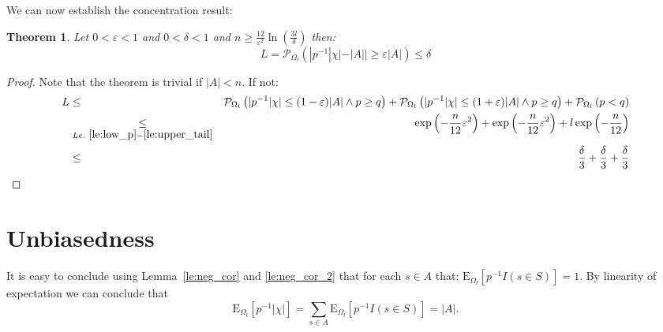 \documentclass{article}
\newcommand{\prob}{\mathcal P}
\newcommand{\expectation}{\mathrm{E}}
\newcommand{\eps}{\varepsilon}
\newtheorem{theorem}{Theorem}
\theoremstyle{definition}
\begin{document}
We can now establish the concentration result:
\begin{theorem}
Let $0 < \eps < 1$ and $0 < \delta < 1$ and $n \geq \frac{12}{\eps^2} \ln\left(\frac{3l}{\delta}\right)$ then:
\[
  L = \prob_{\Omega_l} \left( | p^{-1} |\chi| - |A| | \geq \eps |A| \right) \leq \delta
\]
\end{theorem}
\begin{proof}
Note that the theorem is trivial if $|A| < n$. If not:
\begin{eqnarray*}
  L & \leq & \prob_{\Omega_l} \left( | p^{-1} |\chi| \leq (1-\eps) |A| \wedge p \geq q \right) +
    \prob_{\Omega_l} \left( | p^{-1} |\chi| \leq (1+\eps) |A| \wedge p \geq q \right) +
    \prob_{\Omega_l} \left( p < q \right) \\
    & \underset{Le.~\ref{le:low_p}-\ref{le:upper_tail}}{\leq} &
    \exp\left( - \frac{n}{12} \eps^2 \right)  + \exp\left( - \frac{n}{12} \eps^2 \right) + l \exp\left( - \frac{n}{12} \right) \\
    & \leq & \frac{\delta}{3} + \frac{\delta}{3} + \frac{\delta}{3}
\end{eqnarray*}
\end{proof}

\section{Unbiasedness}
It is easy to conclude using Lemma~\ref{le:neg_cor} and \ref{le:neg_cor_2} that for each $s \in A$ that:
$\expectation_{\Omega_l} [ p^{-1} I(s \in S) ] = 1$.
By linearity of expectation we can conclude that
\[
  \expectation_{\Omega_l} [ p^{-1} |\chi| ] = \sum_{s \in A} \expectation_{\Omega_l} [ p^{-1} I(s \in S) ] = |A| \textrm{.}
\]
\end{document}
